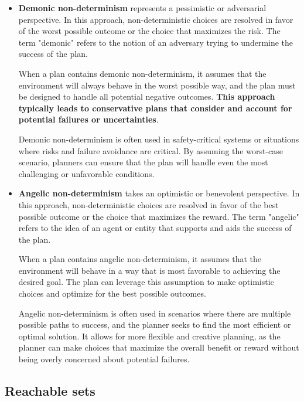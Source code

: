 \documentclass{article}
\begin{document}
\begin{itemize}
    \item \textbf{Demonic non-determinism} represents a pessimistic or adversarial perspective. In this approach, non-deterministic choices are resolved in favor of the worst possible outcome or the choice that maximizes the risk. The term "demonic" refers to the notion of an adversary trying to undermine the success of the plan.

    When a plan contains demonic non-determinism, it assumes that the environment will always behave in the worst possible way, and the plan must be designed to handle all potential negative outcomes. \textbf{This approach typically leads to conservative plans that consider and account for potential failures or uncertainties}.

    Demonic non-determinism is often used in safety-critical systems or situations where risks and failure avoidance are critical. By assuming the worst-case scenario, planners can ensure that the plan will handle even the most challenging or unfavorable conditions.

\item \textbf{Angelic non-determinism} takes an optimistic or benevolent perspective. In this approach, non-deterministic choices are resolved in favor of the best possible outcome or the choice that maximizes the reward. The term "angelic" refers to the idea of an agent or entity that supports and aids the success of the plan.

    When a plan contains angelic non-determinism, it assumes that the environment will behave in a way that is most favorable to achieving the desired goal. The plan can leverage this assumption to make optimistic choices and optimize for the best possible outcomes.

    Angelic non-determinism is often used in scenarios where there are multiple possible paths to success, and the planner seeks to find the most efficient or optimal solution. It allows for more flexible and creative planning, as the planner can make choices that maximize the overall benefit or reward without being overly concerned about potential failures.

\end{itemize}

\newpage

\subsection{Reachable sets}
\end{document}
